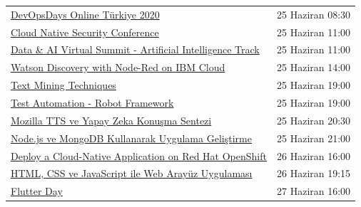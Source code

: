 \documentclass[11pt]{article}
\begin{document}
\begin{longtable}{|p{9.5cm}|l|}
\href{https://kommunity.com/cloud-and-serverless-turkey/events/devopsdays-online-turkiye-2020-130a646d}{DevOpsDays Online Türkiye 2020} & 25 Haziran 08:30\\
\href{https://www.meetup.com/tr-TR/IBMDeveloperTR/events/271222367/}{Cloud Native Security Conference} & 25 Haziran 11:00\\
\href{https://www.meetup.com/tr-TR/Microsoft-Giri\%25C5\%259Fimcilik-Bulu\%25C5\%259Fmalar\%25C4\%25B1/events/271152397/}{Data \& AI Virtual Summit - Artificial Intelligence Track} & 25 Haziran 11:00\\
\href{https://www.meetup.com/tr-TR/IBMDeveloperTR/events/270925205/}{Watson Discovery with Node-Red on IBM Cloud} & 25 Haziran 14:00\\
\href{https://www.meetup.com/tr-TR/Istanbul-KNIME-Users/events/271392949/}{Text Mining Techniques} & 25 Haziran 19:00\\
\href{https://www.meetup.com/tr-TR/Hepsitech-Meetup/events/271247034/}{Test Automation - Robot Framework} & 25 Haziran 19:00\\
\href{https://www.meetup.com/tr-TR/Turkish-AI-Hub/events/271391778/}{Mozilla TTS ve Yapay Zeka Konuşma Sentezi} & 25 Haziran 20:30\\
\href{https://kommunity.com/bilge-adam-teknoloji/events/nodejs-ve-mongodb-kullanarak-uygulama-gelistirme-4e46c1ca}{Node.js ve MongoDB Kullanarak Uygulama Geliştirme} & 25 Haziran 21:00\\
\href{https://www.meetup.com/tr-TR/IBMDeveloperTR/events/270949799/}{Deploy a Cloud-Native Application on Red Hat OpenShift} & 26 Haziran 16:00\\
\href{https://kommunity.com/bilge-adam-teknoloji/events/html-css-ve-javascript-ile-web-arayuz-uygulamasi-1f18a563}{HTML, CSS ve JavaScript ile Web Arayüz Uygulaması} & 26 Haziran 19:15\\
\href{https://www.meetup.com/tr-TR/GDGAnkara/events/271395414/}{Flutter Day} & 27 Haziran 16:00\\
\hline
\end{longtable}
\end{document}
